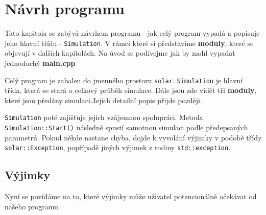
\chapter{Návrh programu}
\label{chap:implementace}
Tato kapitola se zabývá návrhem programu - jak celý program vypadá a popisuje jeho hlavní třídu - \texttt{Simulation}. V rámci které si představíme \textbf{moduly}, které se objevují v dalších kapitolách.
Na úvod se podívejme jak by mohl vypadat jednoduchý \textbf{main.cpp} 


Celý program je zabalen do jmenného prostoru \texttt{solar}. \texttt{Simulation} je hlavní třída, která se stará o celkový průběh simulace. Dále jsou zde vidět tři \textbf{moduly}, které jsou předány simulaci.Jejich detailní popis přijde později.

\texttt{Simulation} poté zajišťuje jejich vzájemnou spolupráci. Metoda \texttt{Simulation::Start()} následně spustí samotnou simulaci podle předepsaných parametrů.
Pokud někde nastane chyba, dojde k vyvolání výjimky v podobě třídy \texttt{solar::Exception}, popřípadě jiných výjimek z rodiny \texttt{std::exception}.




\section{Výjimky}
Nyní se povídáme na to, které výjimky může uživatel potencionálně očekávat od našeho programu.